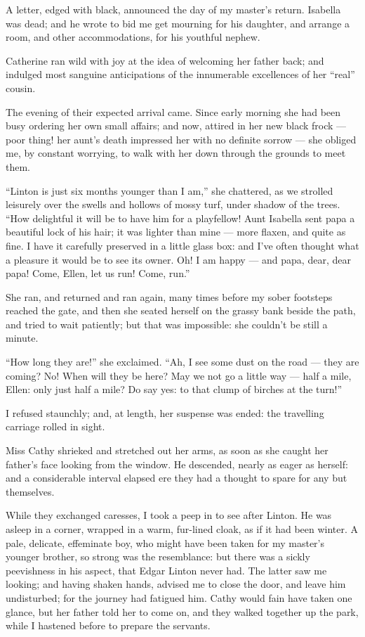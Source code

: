 \par A letter, edged with black, announced the day of my master's return. Isabella was dead; and he wrote to bid me get mourning for his daughter, and arrange a room, and other accommodations, for his youthful nephew.
\par Catherine ran wild with joy at the idea of welcoming her father back; and indulged most sanguine anticipations of the innumerable excellences of her “real” cousin.
\par The evening of their expected arrival came. Since early morning she had been busy ordering her own small affairs; and now, attired in her new black frock — poor thing! her aunt's death impressed her with no definite sorrow — she obliged me, by constant worrying, to walk with her down through the grounds to meet them.
\par “Linton is just six months younger than I am,” she chattered, as we strolled leisurely over the swells and hollows of mossy turf, under shadow of the trees. “How delightful it will be to have him for a playfellow! Aunt Isabella sent papa a beautiful lock of his hair; it was lighter than mine — more flaxen, and quite as fine. I have it carefully preserved in a little glass box: and I've often thought what a pleasure it would be to see its owner. Oh! I am happy — and papa, dear, dear papa! Come, Ellen, let us run! Come, run.”
\par She ran, and returned and ran again, many times before my sober footsteps reached the gate, and then she seated herself on the grassy bank beside the path, and tried to wait patiently; but that was impossible: she couldn't be still a minute.
\par “How long they are!” she exclaimed. “Ah, I see some dust on the road — they are coming? No! When will they be here? May we not go a little way — half a mile, Ellen: only just half a mile? Do say yes: to that clump of birches at the turn!”
\par I refused staunchly; and, at length, her suspense was ended: the travelling carriage rolled in sight.
\par Miss Cathy shrieked and stretched out her arms, as soon as she caught her father's face looking from the window. He descended, nearly as eager as herself: and a considerable interval elapsed ere they had a thought to spare for any but themselves.
\par While they exchanged caresses, I took a peep in to see after Linton. He was asleep in a corner, wrapped in a warm, fur-lined cloak, as if it had been winter. A pale, delicate, effeminate boy, who might have been taken for my master's younger brother, so strong was the resemblance: but there was a sickly peevishness in his aspect, that Edgar Linton never had. The latter saw me looking; and having shaken hands, advised me to close the door, and leave him undisturbed; for the journey had fatigued him. Cathy would fain have taken one glance, but her father told her to come on, and they walked together up the park, while I hastened before to prepare the servants.
